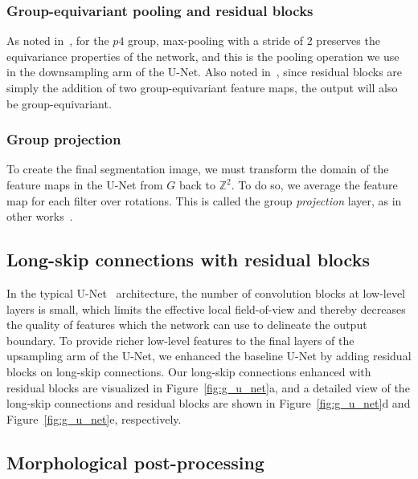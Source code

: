 \subsubsection*{Group-equivariant pooling and residual blocks}

As noted in~\cite{gcnn}, for the $p4$ group, max-pooling with a stride of 2 preserves the equivariance properties of the network, and this is the pooling operation we use in the downsampling arm of the U-Net.
Also noted in~\cite{gcnn}, since residual blocks are simply the addition of two group-equivariant feature maps, the output will also be group-equivariant.

\subsubsection*{Group projection}
To create the final segmentation image, we must transform the domain of the feature maps in the U-Net from $G$ back to $\mathbb{Z}^{2}$.
To do so, we average the feature map for each filter over rotations.
This is called the group \emph{projection} layer, as in other works~\cite{DBLP:journals/corr/abs-1807-00583}.

\subsection{Long-skip connections with residual blocks}
In the typical U-Net~\cite{unet} architecture, the number of convolution blocks at low-level layers is small, which limits the effective local field-of-view and thereby decreases the quality of features which the network can use to delineate the output boundary.
To provide richer low-level features to the final layers of the upsampling arm of the U-Net, we enhanced the baseline U-Net by adding residual blocks on long-skip connections.
Our long-skip connections enhanced with residual blocks are visualized in Figure~\ref{fig:g_u_net}a, and a detailed view of the long-skip connections and residual blocks are shown in Figure~\ref{fig:g_u_net}d and Figure~\ref{fig:g_u_net}e, respectively.

\subsection{Morphological post-processing}

